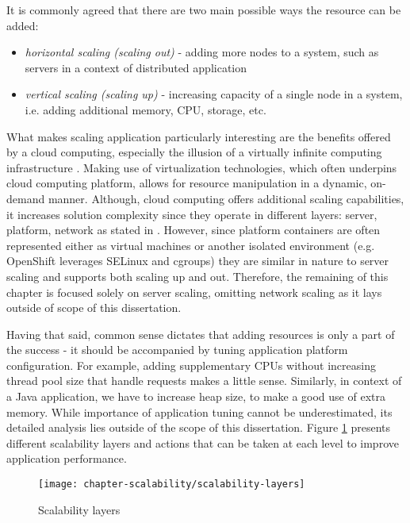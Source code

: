 It is commonly agreed that there are two main possible ways the resource can be added:
\begin{itemize}
	\item \textit{horizontal scaling (scaling out)} - adding more nodes to a system, such as servers in a context of distributed application
	\item \textit{vertical scaling (scaling up)} - increasing capacity of a single node in a system, i.e. adding additional memory, CPU, storage, etc.
\end{itemize}

What makes scaling application particularly interesting are the benefits offered by a cloud computing, especially the illusion of a virtually infinite computing infrastructure \cite{VaRoBu11}. Making use of virtualization technologies, which often underpins cloud computing platform, allows for resource manipulation in a dynamic, on-demand manner. Although, cloud computing offers additional scaling capabilities, it increases solution complexity since they operate in different layers: server, platform, network as stated in \cite{VaRoBu11}. However, since platform containers are often represented either as virtual machines or another isolated environment (e.g. OpenShift leverages SELinux and cgroups) they are similar in nature to server scaling and supports both scaling up and out. Therefore, the remaining of this chapter is focused solely on server scaling, omitting network scaling as it lays outside of scope of this dissertation.

Having that said, common sense dictates that adding resources is only a part of the success - it should be accompanied by tuning application platform configuration. For example, adding supplementary CPUs without increasing thread pool size that handle requests makes a little sense. Similarly, in context of a Java application, we have to increase heap size, to make a good use of extra memory. While importance of application tuning cannot be underestimated, its detailed analysis lies outside of the scope of this dissertation. Figure \ref{fig:scalability-layers} presents different scalability layers and actions that can be taken at each level to improve application performance.

\begin{figure}[!ht]
  \begin{center}
    \texttt{[image: chapter-scalability/scalability-layers]}
  \end{center}
  \caption{Scalability layers}
  \label{fig:scalability-layers}
\end{figure}

